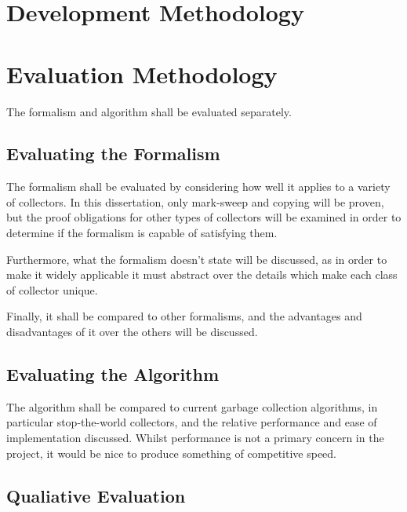 \section{Development Methodology}
\label{sec:analysis-development}


\section{Evaluation Methodology}
\label{sec:analysis-evaluation}

The formalism and algorithm shall be evaluated separately.

\subsection{Evaluating the Formalism}
\label{sec:analysis-evaluation-formalism}

The formalism shall be evaluated by considering how well it applies to
a variety of collectors. In this dissertation, only mark-sweep and
copying will be proven, but the proof obligations for other types of
collectors will be examined in order to determine if the formalism is
capable of satisfying them.

Furthermore, what the formalism doesn't state will be discussed, as in
order to make it widely applicable it must abstract over the details
which make each class of collector unique.

Finally, it shall be compared to other formalisms, and the advantages
and disadvantages of it over the others will be discussed.

\subsection{Evaluating the Algorithm}
\label{sec:analysis-evaluation-algorithm}

The algorithm shall be compared to current garbage collection
algorithms, in particular stop-the-world collectors, and the relative
performance and ease of implementation discussed. Whilst performance
is not a primary concern in the project, it would be nice to produce
something of competitive speed.

\subsection{Qualiative Evaluation}
\label{sec:analysis-evaluation-qualitative}

